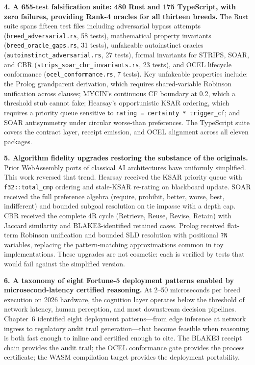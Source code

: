 \textbf{4. A 655-test falsification suite: 480 Rust and 175 TypeScript, with zero failures, providing Rank-4 oracles for all thirteen breeds.}
The Rust suite spans fifteen test files including adversarial bypass attempts (\texttt{breed\_adversarial.rs}, 58 tests), mathematical property invariants (\texttt{breed\_oracle\_gaps.rs}, 31 tests), unfakeable autoinstinct oracles (\texttt{autoinstinct\_adversarial.rs}, 27 tests), formal invariants for STRIPS, SOAR, and CBR (\texttt{strips\_soar\_cbr\_invariants.rs}, 23 tests), and OCEL lifecycle conformance (\texttt{ocel\_conformance.rs}, 7 tests). Key unfakeable properties include: the Prolog grandparent derivation, which requires shared-variable Robinson unification across clauses; MYCIN's continuous CF boundary at 0.2, which a threshold stub cannot fake; Hearsay's opportunistic KSAR ordering, which requires a priority queue sensitive to \texttt{rating = certainty * trigger\_cf}; and SOAR antisymmetry under circular worse-than preferences. The TypeScript suite covers the contract layer, receipt emission, and OCEL alignment across all eleven packages.

\textbf{5. Algorithm fidelity upgrades restoring the substance of the originals.}
Prior WebAssembly ports of classical AI architectures have uniformly simplified. This work reversed that trend. Hearsay received the KSAR priority queue with \texttt{f32::total\_cmp} ordering and stale-KSAR re-rating on blackboard update. SOAR received the full preference algebra (require, prohibit, better, worse, best, indifferent) and bounded subgoal resolution on tie impasse with a depth cap. CBR received the complete 4R cycle (Retrieve, Reuse, Revise, Retain) with Jaccard similarity and BLAKE3-identified retained cases. Prolog received flat-term Robinson unification and bounded SLD resolution with positional \texttt{?N} variables, replacing the pattern-matching approximations common in toy implementations. These upgrades are not cosmetic: each is verified by tests that would fail against the simplified version.

\textbf{6. A taxonomy of eight Fortune-5 deployment patterns enabled by microsecond-latency certified reasoning.}
At 2--50 microseconds per breed execution on 2026 hardware, the cognition layer operates below the threshold of network latency, human perception, and most downstream decision pipelines. Chapter~6 identified eight deployment patterns---from edge inference at network ingress to regulatory audit trail generation---that become feasible when reasoning is both fast enough to inline and certified enough to cite. The BLAKE3 receipt chain provides the audit trail; the OCEL conformance gate provides the process certificate; the WASM compilation target provides the deployment portability.

